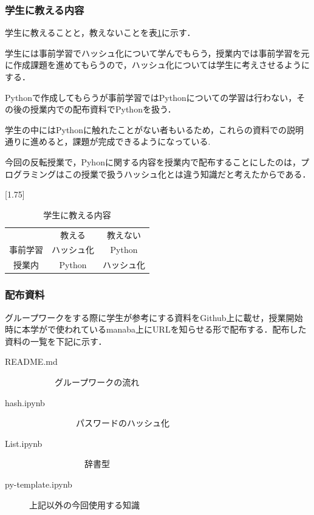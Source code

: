 \documentclass[a4j,11pt]{jsarticle}
\begin{document}
\newpage

\subsubsection{学生に教える内容}

学生に教えることと，教えないことを表\ref{osi}に示す．

学生には事前学習でハッシュ化について学んでもらう，授業内では事前学習を元に作成課題を進めてもらうので，ハッシュ化については学生に考えさせるようにする．

Pythonで作成してもらうが事前学習ではPythonについての学習は行わない，その後の授業内での配布資料でPythonを扱う．

学生の中にはPythonに触れたことがない者もいるため，これらの資料での説明通りに進めると，課題が完成できるようになっている.

今回の反転授業で，Pyhonに関する内容を授業内で配布することにしたのは，プログラミングはこの授業で扱うハッシュ化とは違う知識だと考えたからである．

\begin{table}[htbp]
\begin{center}
\caption{学生に教える内容}
\scalebox{1.75}[1.75]{
\begin{tabular}{|c|c|c|}
\cline{1-3}
 {} & 教える&教えない \\ \cline{1-3}  
事前学習 & ハッシュ化 &Python \\ \cline{1-3}  
 授業内 & Python &ハッシュ化\\ \cline{1-3}  
\end{tabular}
}
\label{osi}
\end{center}
\end{table}

\newpage 

\subsubsection{配布資料}
グループワークをする際に学生が参考にする資料をGithub上に載せ，授業開始時に本学がで使われているmanaba上にURLを知らせる形で配布する．配布した資料の一覧を下記に示す．

\begin{description}

 \item[README.md]   \ \ \ \ \ \      グループワークの流れ
  \item[hash.ipynb]\ \ \ \ \ \ \ \ \ \ \ パスワードのハッシュ化
  \item[List.ipynb]\ \ \ \ \ \ \ \ \ \ \ \ \  辞書型
  \item[py-template.ipynb]上記以外の今回使用する知識
  
\end{description}
\end{document}
